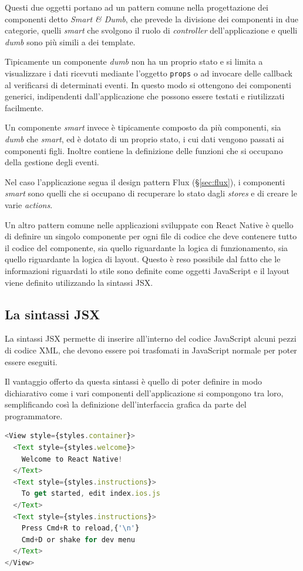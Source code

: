 Questi due oggetti portano ad un pattern comune nella progettazione dei componenti detto \textit{Smart \& Dumb}, che prevede la divisione dei componenti in due categorie, quelli \textit{smart} che svolgono il ruolo di \textit{controller} dell'applicazione e quelli \textit{dumb} sono più simili a dei template.

Tipicamente un componente \textit{dumb} non ha un proprio stato e si limita a visualizzare i dati ricevuti mediante l'oggetto \texttt{props} o ad invocare delle callback al verificarsi di determinati eventi. In questo modo si ottengono dei componenti generici, indipendenti dall'applicazione che possono essere testati e riutilizzati facilmente.

Un componente \textit{smart} invece è tipicamente composto da più componenti, sia \textit{dumb} che \textit{smart}, ed è dotato di un proprio stato, i cui dati vengono passati ai componenti figli. Inoltre contiene la definizione delle funzioni che si occupano della gestione degli eventi.

Nel caso l'applicazione segua il design pattern Flux (§\ref{sec:flux}), i componenti \textit{smart} sono quelli che si occupano di recuperare lo stato dagli \textit{stores} e di creare le varie \textit{actions}.

Un altro pattern comune nelle applicazioni sviluppate con React Native è quello di definire un singolo componente per ogni file di codice che deve contenere tutto il codice del componente, sia quello riguardante la logica di funzionamento, sia quello riguardante la logica di layout.
Questo è reso possibile dal fatto che le informazioni riguardati lo stile sono definite come oggetti JavaScript e il layout viene definito utilizzando la sintassi JSX.

\subsection{La sintassi JSX}

La sintassi JSX permette di inserire all'interno del codice JavaScript alcuni pezzi di codice XML, che devono essere poi trasfomati in JavaScript normale per poter essere eseguiti.

Il vantaggio offerto da questa sintassi è quello di poter definire in modo dichiarativo come i vari componenti dell'applicazione si compongono tra loro, semplificando così la definizione dell'interfaccia grafica da parte del programmatore.

\begin{lstlisting}[language=JavaScript, caption=Esempio della sintassi JSX di React Native]
<View style={styles.container}>
  <Text style={styles.welcome}>
    Welcome to React Native!
  </Text>
  <Text style={styles.instructions}>
    To get started, edit index.ios.js
  </Text>
  <Text style={styles.instructions}>
    Press Cmd+R to reload,{'\n'}
    Cmd+D or shake for dev menu
  </Text>
</View>
\end{lstlisting}

